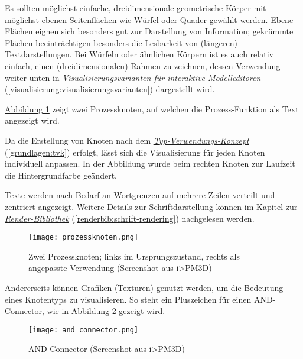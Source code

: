 \documentclass[a4paper,10pt]{sphinxmanual}
\begin{document}
Es sollten möglichst einfache, dreidimensionale geometrische Körper mit möglichst ebenen Seitenflächen wie Würfel oder Quader gewählt werden.
Ebene Flächen eignen sich besonders gut zur Darstellung von Information; gekrümmte Flächen beeinträchtigen besonders die Lesbarkeit von (längeren) Textdarstellungen.
Bei Würfeln oder ähnlichen Körpern ist es auch relativ einfach, einen (dreidimensionalen) Rahmen zu zeichnen, dessen Verwendung weiter unten in {\hyperref[visualisierung:visualisierungsvarianten]{\emph{Visualisierungsvarianten für interaktive Modelleditoren}}} (\autoref*{visualisierung:visualisierungsvarianten}) dargestellt wird.

\hyperref[visualisierung:prozessknoten]{Abbildung  \ref*{visualisierung:prozessknoten}} zeigt zwei Prozessknoten, auf welchen die Prozess-Funktion als Text angezeigt wird.

Da die Erstellung von Knoten nach dem {\hyperref[grundlagen:tvk]{\emph{Typ-Verwendungs-Konzept}}} (\autoref*{grundlagen:tvk}) erfolgt, lässt sich die Visualisierung für jeden Knoten individuell anpassen.
In der Abbildung wurde beim rechten Knoten zur Laufzeit die Hintergrundfarbe geändert.

Texte werden nach Bedarf an Wortgrenzen auf mehrere Zeilen verteilt und zentriert angezeigt.
Weitere Details zur Schriftdarstellung können im Kapitel zur {\hyperref[renderbib:schrift-rendering]{\emph{Render-Bibliothek}}} (\autoref*{renderbib:schrift-rendering}) nachgelesen werden.
\begin{figure}[htbp]
\centering
\capstart

\texttt{[image: prozessknoten.png]}
\caption{Zwei Prozessknoten; links im Ursprungszustand, rechts als angepasste Verwendung (Screenshot aus i\textgreater{}PM3D)}\label{visualisierung:prozessknoten}\end{figure}

Andererseits können Grafiken (Texturen) genutzt werden, um die Bedeutung eines Knotentyps zu visualisieren.
So steht ein Pluszeichen für einen AND-Connector, wie in \hyperref[visualisierung:and-connector]{Abbildung  \ref*{visualisierung:and-connector}} gezeigt wird.
\begin{figure}[htbp]
\centering
\capstart

\texttt{[image: and\_connector.png]}
\caption{AND-Connector (Screenshot aus i\textgreater{}PM3D)}\label{visualisierung:and-connector}\end{figure}
\end{document}
